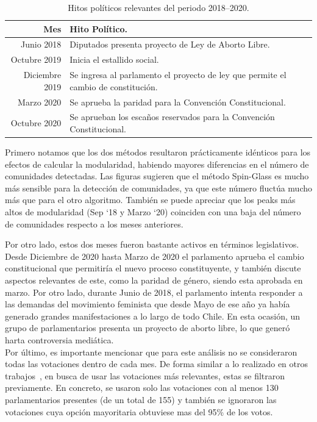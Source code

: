 \documentclass[hyperref]{proyectotesis}
\begin{document}
\begin{table}[ht!]
    \centering
    \caption{Hitos políticos relevantes del periodo 2018--2020.}
    \label{hp} 
    \vspace{3mm}
    \begin{tabular}{r|l}
    Mes & Hito Político.\\
    \hline
    Junio 2018 & Diputados presenta proyecto de Ley de Aborto Libre.\\
    Octubre 2019 & Inicia el estallido social.\\
    Diciembre 2019 & Se ingresa al parlamento el proyecto de ley que permite el cambio de constitución.\\
    Marzo 2020 & Se aprueba la paridad para la Convención Constitucional.\\
    Octubre 2020 & Se aprueban los escaños reservados para la Convención Constitucional.
    \end{tabular}
\end{table}


Primero notamos que los dos métodos resultaron prácticamente idénticos para los efectos de calcular la modularidad, habiendo mayores diferencias en el número de comunidades detectadas. Las figuras sugieren que el método Spin-Glass es mucho más sensible para la detección de comunidades, ya que este número fluctúa mucho más que para el otro algoritmo. También se puede apreciar que los peaks más altos de modularidad (Sep `18 y Marzo `20) coinciden con una baja del número de comunidades respecto a los meses anteriores.

Por otro lado, estos dos meses fueron bastante activos en términos legislativos. Desde Diciembre de 2020 hasta Marzo de 2020 el parlamento aprueba el cambio constitucional que permitiría el nuevo proceso constituyente, y también discute aspectos relevantes de este, como la paridad de género, siendo esta aprobada en marzo. Por otro lado, durante Junio de 2018, el parlamento intenta responder a las demandas del movimiento feminista que desde Mayo de ese año ya había generado grandes manifestaciones a lo largo de todo Chile. En esta ocasión, un grupo de parlamentarios presenta un proyecto de aborto libre, lo que generó harta controversia mediática.\\

Por último, es importante mencionar que para este análisis no se consideraron todas las votaciones dentro de cada mes. De forma similar a lo realizado en otros trabajos~\cite{andris_rise_2015, schoch_legislators_2020}, en busca de usar las votaciones más relevantes, estas se filtraron previamente. En concreto, se usaron solo las votaciones con al menos 130 parlamentarios presentes (de un total de 155) y también se ignoraron las votaciones cuya opción mayoritaria obtuviese mas del 95\% de los votos.
\end{document}
